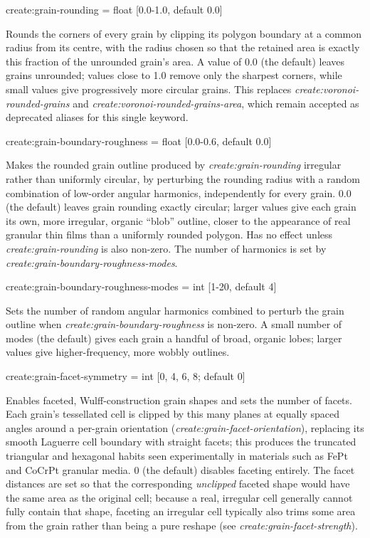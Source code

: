 {\zicf create:grain-rounding = float [0.0-1.0, default 0.0]} Rounds the corners of every grain by clipping its polygon boundary at a common radius from its centre, with the radius chosen so that the retained area is exactly this fraction of the unrounded grain's area. A value of 0.0 (the default) leaves grains unrounded; values close to 1.0 remove only the sharpest corners, while small values give progressively more circular grains. This replaces \textit{create:voronoi-rounded-grains} and \textit{create:voronoi-rounded-grains-area}, which remain accepted as deprecated aliases for this single keyword.

{\zicf create:grain-boundary-roughness = float [0.0-0.6, default 0.0]} Makes the rounded grain outline produced by \textit{create:grain-rounding} irregular rather than uniformly circular, by perturbing the rounding radius with a random combination of low-order angular harmonics, independently for every grain. 0.0 (the default) leaves grain rounding exactly circular; larger values give each grain its own, more irregular, organic ``blob'' outline, closer to the appearance of real granular thin films than a uniformly rounded polygon. Has no effect unless \textit{create:grain-rounding} is also non-zero. The number of harmonics is set by \textit{create:grain-boundary-roughness-modes}.

{\zicf create:grain-boundary-roughness-modes = int [1-20, default 4]} Sets the number of random angular harmonics combined to perturb the grain outline when \textit{create:grain-boundary-roughness} is non-zero. A small number of modes (the default) gives each grain a handful of broad, organic lobes; larger values give higher-frequency, more wobbly outlines.

{\zicf create:grain-facet-symmetry = int [0, 4, 6, 8; default 0]} Enables faceted, Wulff-construction grain shapes and sets the number of facets. Each grain's tessellated cell is clipped by this many planes at equally spaced angles around a per-grain orientation (\textit{create:grain-facet-orientation}), replacing its smooth Laguerre cell boundary with straight facets; this produces the truncated triangular and hexagonal habits seen experimentally in materials such as FePt and CoCrPt granular media. 0 (the default) disables faceting entirely. The facet distances are set so that the corresponding \emph{unclipped} faceted shape would have the same area as the original cell; because a real, irregular cell generally cannot fully contain that shape, faceting an irregular cell typically also trims some area from the grain rather than being a pure reshape (see \textit{create:grain-facet-strength}).

